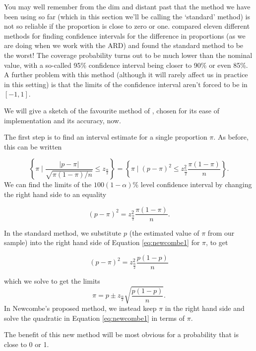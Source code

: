 \documentclass[
  openany]{book}
\theoremstyle{definition}
\theoremstyle{definition}
\theoremstyle{definition}
\theoremstyle{definition}
\theoremstyle{remark}
\begin{document}
You may well remember from the dim and distant past that the method we have been using so far (which in this section we'll be calling the `standard' method) is not so reliable if the proportion is close to zero or one. \citet{newcombe1998interval} compared eleven different methods for finding confidence intervals for the difference in proportions (as we are doing when we work with the ARD) and found the standard method to be the worst! The coverage probability turns out to be much lower than the nominal value, with a so-called 95\% confidence interval being closer to 90\% or even 85\%. A further problem with this method (although it will rarely affect us in practice in this setting) is that the limits of the confidence interval aren't forced to be in \(\left[-1,1\right]\).

We will give a sketch of the favourite method of \citet{newcombe1998interval}, chosen for its ease of implementation and its accuracy, now.

The first step is to find an interval estimate for a single proportion \(\pi\). As before, this can be written

\[\left\lbrace \pi \mid \frac{\lvert p - \pi \rvert}{\sqrt{\pi\left(1-\pi\right)/n}} \leq z_{\frac{\alpha}{2}} \right\rbrace = \left\lbrace \pi \mid \left(p - \pi\right)^2 \leq z^2_{\frac{\alpha}{2}}\frac{\pi\left(1-\pi\right)}{n} \right\rbrace. \]
We can find the limits of the \(100\left(1-\alpha\right)\)\% level confidence interval by changing the right hand side to an equality

\begin{equation}
\left(p - \pi\right)^2 = z^2_{\frac{\alpha}{2}}\frac{\pi\left(1-\pi\right)}{n}.
\label{eq:newcombe1}
\end{equation}

In the standard method, we substitute \(p\) (the estimated value of \(\pi\) from our sample) into the right hand side of Equation \eqref{eq:newcombe1} for \(\pi\), to get

\[\left(p - \pi\right)^2 = z^2_{\frac{\alpha}{2}}\frac{p\left(1-p\right)}{n}\]

which we solve to get the limits
\[ \pi = p \pm z_{\frac{\alpha}{2}}\sqrt{\frac{p\left(1-p\right)}{n}}.\]
In Newcombe's proposed method, we instead keep \(\pi\) in the right hand side and solve the quadratic in Equation \eqref{eq:newcombe1} in terms of \(\pi\).

The benefit of this new method will be most obvious for a probability that is close to 0 or 1.
\end{document}
